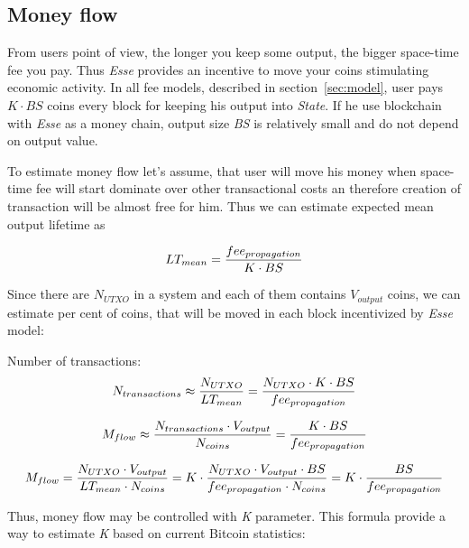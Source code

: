 \documentclass[]{article}   %
\newcommand{\authnote}[2]{\marginpar{\parbox{\marginparwidth}{\tiny %
  \textsf{#1 {\textcolor{blue}{notes: #2}}}}}%
  \textcolor{blue}{\textbf{\dag}}}
\newcommand{\authnote}[2]{
  \textsf{#1 \textcolor{blue}{: #2}}}
\newcommand{\authnote}[2]{}
\newcommand{\dnote}[1]{{\authnote{\textcolor{blue}{Dima notes}}{#1}}}
\newcommand{\esse}{\textit{Esse}}
\newcommand{\state}{\textit{State}}
\begin{document}
\subsection{Money flow}
\label{sec:flow}

From users point of view, the longer you keep some output, the bigger space-time fee you pay. Thus \esse{} provides an incentive to move your coins stimulating economic activity. In all fee models, described in section~\ref{sec:model}, user pays ${K \cdot BS}$ coins every block for keeping his output into \state{}. If he use blockchain with \esse{} as a money chain, output size \textit{BS} is relatively small and do not depend on output value.

To estimate money flow let's assume, that user will move his money when space-time fee will start dominate over other transactional costs an therefore creation of transaction will be almost free for him. Thus we can estimate expected mean output lifetime as

\begin{equation}
\label{eq:ltmean}
LT_{mean}={fee_{propagation} \over K \cdot BS}
\end{equation}

Since there are $N_{UTXO}$ in a system and each of them contains $V_{output}$ coins, we can estimate per cent of coins, that will be moved in each block incentivized by \esse{} model:

\dnote{start: estimate number of transactions per block}
Number of transactions:
\begin{equation}
N_{transactions} \approx {N_{UTXO} \over LT_{mean}} = {N_{UTXO} \cdot K \cdot BS \over fee_{propagation}}
\end{equation}

\begin{equation}
M_{flow} \approx { N_{transactions} \cdot V_{output} \over N_{coins}} = {K \cdot BS \over fee_{propagation}}
\end{equation}
\dnote{end: estimate number of transactions per block}

\begin{equation}
M_{flow}={N_{UTXO} \cdot V_{output} \over LT_{mean} \cdot N_{coins}}=K \cdot {N_{UTXO} \cdot V_{output} \cdot BS \over fee_{propagation} \cdot N_{coins}} = K \cdot {BS \over fee_{propagation}}
\end{equation}

Thus, money flow may be controlled with \textit{K} parameter. This formula provide a way to estimate \textit{K} based on current Bitcoin statistics:
\end{document}
